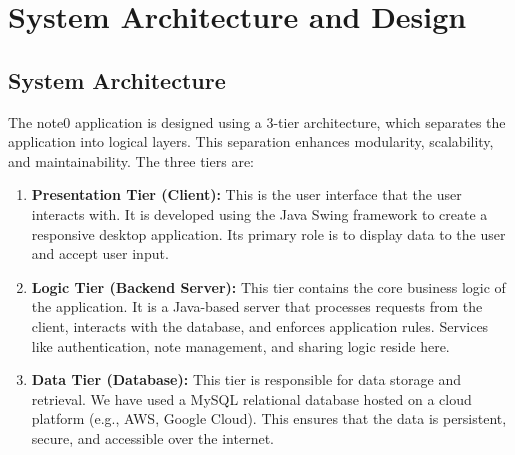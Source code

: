 \documentclass[12pt, a4paper]{report}
\begin{document}
\chapter{System Architecture and Design}

\section{System Architecture}
The note0 application is designed using a 3-tier architecture, which separates the application into logical layers. This separation enhances modularity, scalability, and maintainability. The three tiers are:

\begin{enumerate}
    \item \textbf{Presentation Tier (Client):} This is the user interface that the user interacts with. It is developed using the Java Swing framework to create a responsive desktop application. Its primary role is to display data to the user and accept user input.
    \item \textbf{Logic Tier (Backend Server):} This tier contains the core business logic of the application. It is a Java-based server that processes requests from the client, interacts with the database, and enforces application rules. Services like authentication, note management, and sharing logic reside here.
    \item \textbf{Data Tier (Database):} This tier is responsible for data storage and retrieval. We have used a MySQL relational database hosted on a cloud platform (e.g., AWS, Google Cloud). This ensures that the data is persistent, secure, and accessible over the internet.
\end{enumerate}
\end{document}

